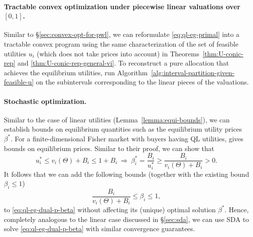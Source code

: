 \paragraph{Tractable convex optimization under piecewise linear valuations over $[0,1]$.} Similar to \S\ref{sec:convex-opt-for-pwl}, we can reformulate \eqref{eq:ql-eg-primal} into a tractable convex program using the same characterization of the set of feasible utilities $u_i$ (which does not take prices into account) in Theorems~\ref{thm:U-conic-rep} and \eqref{thm:U-conic-rep-general-vi}. To reconstruct a pure allocation that achieves the equilibrium utilities, run Algorithm~\ref{alg:interval-partition-given-feasible-u} on the subintervals corresponding to the linear pieces of the valuations.

\paragraph{Stochastic optimization.} 
Similar to the case of linear utilities (Lemma~\ref{lemma:equi-bounds}), we can establish bounds on equilibrium quantities such as the equilibrium utility prices $\beta^*$. For a finite-dimensional Fisher market with buyers having QL utilities, \cite[Lemma~2]{gao2020first} gives bounds on equilibrium prices. Similar to their proof, we can show that 
\[u^*_i \leq v_i(\Theta) + B_i \leq 1+B_i \ \Rightarrow\ \beta^*_i = \frac{B_i}{u^*_i} \geq \frac{B_i}{ v_i(\Theta) +B_i} > 0.  \]
It follows that we can add the following bounds (together with the existing bound $\beta_i\leq 1$)
\[ \frac{B_i}{v_i(\Theta) + B_i} \leq \beta_i \leq  1, \]
to \eqref{eq:ql-eg-dual-p-beta} without affecting its (unique) optimal solution $\beta^*$. 
Hence, completely analogous to the linear case discussed in \S\ref{sec:sda}, we can use SDA to solve \eqref{eq:ql-eg-dual-p-beta}  with similar convergence guarantees.





